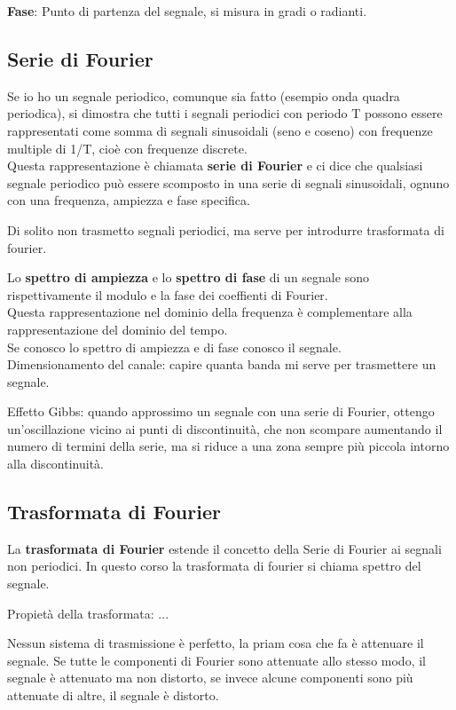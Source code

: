 \textbf{Fase}: Punto di partenza del segnale, si misura in gradi o radianti.

\subsection{Serie di Fourier}
Se io ho un segnale periodico, comunque sia fatto (esempio onda quadra periodica), 
si dimostra che tutti i segnali periodici con periodo T possono essere rappresentati 
come somma di segnali sinusoidali (seno e coseno) con frequenze multiple di 1/T, 
cioè con frequenze discrete.\\
Questa rappresentazione è chiamata \textbf{serie di Fourier} e ci dice che qualsiasi 
segnale periodico può essere scomposto in una serie di segnali sinusoidali, ognuno 
con una frequenza, ampiezza e fase specifica.

Di solito non trasmetto segnali periodici, ma serve per introdurre trasformata di fourier.

Lo \textbf{spettro di ampiezza} e lo \textbf{spettro di fase} di un segnale 
sono rispettivamente il modulo e la fase dei coeffienti di Fourier.\\
Questa rappresentazione nel dominio della frequenza è complementare alla rappresentazione
del dominio del tempo.\\
Se conosco lo spettro di ampiezza e di fase conosco il segnale.\\
Dimensionamento del canale: capire quanta banda mi serve per trasmettere un segnale.

Effetto Gibbs: quando approssimo un segnale con una serie di Fourier, ottengo 
un'oscillazione vicino ai punti di discontinuità, che non scompare aumentando 
il numero di termini della serie, ma si riduce a una zona sempre più piccola 
intorno alla discontinuità.

\subsection{Trasformata di Fourier}
La \textbf{trasformata di Fourier} estende il concetto della Serie di Fourier ai segnali
non periodici.
 In questo corso la trasformata di fourier si chiama spettro del segnale.

Propietà della trasformata: ...

Nessun sistema di trasmissione è perfetto, la priam cosa che fa è attenuare il segnale. 
Se tutte le componenti di Fourier sono attenuate allo stesso modo, il segnale è 
attenuato ma non distorto, se invece alcune componenti sono più attenuate di altre, 
il segnale è distorto.

